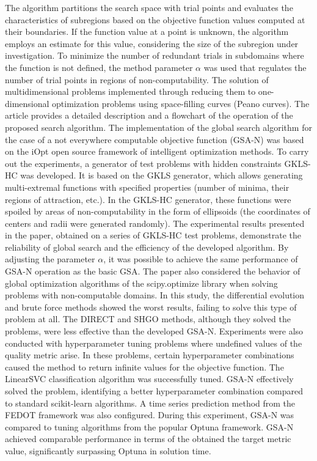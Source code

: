 \documentclass[a4paper,12pt,russian]{article}
\begin{document}
\begin{small}
The algorithm partitions the search space with trial points and evaluates the characteristics of subregions based on the objective function values computed at their boundaries.  If the function value at a point is unknown, the algorithm employs an estimate for this value, considering the size of the subregion under investigation.
To minimize the number of redundant trials in subdomains where the function is not defined, the method parameter $\alpha$ was used that regulates the number of trial points in regions of non-computability.
The solution of multidimensional problems implemented through reducing them to one-dimensional optimization problems using space-filling curves (Peano curves).
The article provides a detailed description and a flowchart of the operation of the proposed search algorithm.
The implementation of the global search algorithm for the case of a not everywhere computable objective function (GSA-N) was based on the iOpt open source framework of intelligent optimization methods.
To carry out the experiments, a generator of test problems with hidden constraints GKLS-HC was developed. It is based on the GKLS generator, which allows generating multi-extremal functions with specified properties (number of minima, their regions of attraction, etc.). In the GKLS-HC generator, these functions were spoiled by areas of non-computability in the form of ellipsoids (the coordinates of centers and radii were generated randomly).
The experimental results presented in the paper, obtained on a series of GKLS-HC test problems, demonstrate the reliability of global search and the efficiency of the developed algorithm. By adjusting the parameter $\alpha$, it was possible to achieve the same performance of GSA-N operation as the basic GSA.
The paper also considered the behavior of global optimization algorithms of the scipy.optimize library when solving problems with non-computable domains. In this study, the differential evolution and brute force methods showed the worst results, failing to solve this type of problem at all. The DIRECT and SHGO methods, although they solved the problems, were less effective than the developed GSA-N.
Experiments were also conducted with hyperparameter tuning problems where undefined values of the quality metric arise. In these problems, certain hyperparameter combinations caused the method to return infinite values for the objective function. The LinearSVC classification algorithm was successfully tuned. GSA-N effectively solved the problem, identifying a better hyperparameter combination compared to standard scikit-learn algorithms. A time series prediction method from the FEDOT framework was also configured. During this experiment, GSA-N was compared to tuning algorithms from the popular Optuna framework. GSA-N achieved comparable performance in terms of the obtained the target metric value, significantly surpassing Optuna in solution time.

\end{small}
\end{document}
